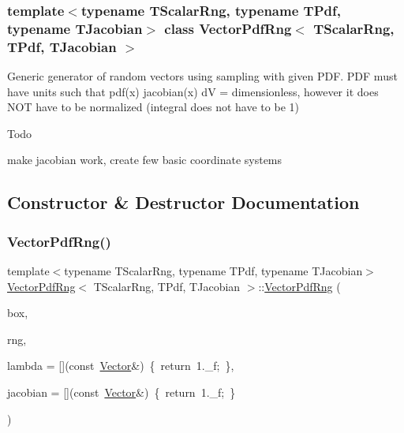 \subsubsection*{template$<$typename T\+Scalar\+Rng, typename T\+Pdf, typename T\+Jacobian$>$\newline
class Vector\+Pdf\+Rng$<$ T\+Scalar\+Rng, T\+Pdf, T\+Jacobian $>$}

Generic generator of random vectors using sampling with given P\+DF. P\+DF must have units such that  pdf(x) jacobian(x) dV = dimensionless, however it does N\+OT have to be normalized (integral does not have to be 1) \begin{DoxyRefDesc}{Todo}
\item[\hyperlink{todo__todo000020}{Todo}]make jacobian work, create few basic coordinate systems \end{DoxyRefDesc}


\subsection{Constructor \& Destructor Documentation}
\hypertarget{classVectorPdfRng_a4251ad37fad4cdbbbcfba87ba4997d12}{}\label{classVectorPdfRng_a4251ad37fad4cdbbbcfba87ba4997d12} 
\subsubsection{\texorpdfstring{Vector\+Pdf\+Rng()}{VectorPdfRng()}}
{\footnotesize\ttfamily template$<$typename T\+Scalar\+Rng, typename T\+Pdf, typename T\+Jacobian$>$ \\
\hyperlink{classVectorPdfRng}{Vector\+Pdf\+Rng}$<$ T\+Scalar\+Rng, T\+Pdf, T\+Jacobian $>$\+::\hyperlink{classVectorPdfRng}{Vector\+Pdf\+Rng} (\begin{DoxyParamCaption}\item[{const \hyperlink{classBox}{Box} \&}]{box,  }\item[{T\+Scalar\+Rng \&\&}]{rng,  }\item[{T\+Pdf \&\&}]{lambda = {\ttfamily \mbox{[}\mbox{]}(const~\hyperlink{classBasicVector}{Vector}\&)~\{~return~1.\+\_\+f;~\}},  }\item[{T\+Jacobian \&\&}]{jacobian = {\ttfamily \mbox{[}\mbox{]}(const~\hyperlink{classBasicVector}{Vector}\&)~\{~return~1.\+\_\+f;~\}} }\end{DoxyParamCaption})\hspace{0.3cm}{\ttfamily [inline]}}

